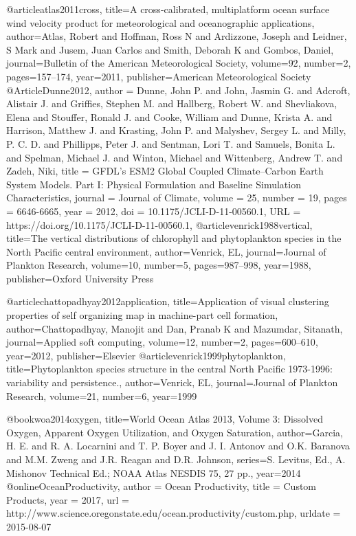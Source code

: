 {{{{{{{{{{{{@article{atlas2011cross,
  title={A cross-calibrated, multiplatform ocean surface wind velocity product for meteorological and oceanographic applications},
  author={Atlas, Robert and Hoffman, Ross N and Ardizzone, Joseph and Leidner, S Mark and Jusem, Juan Carlos and Smith, Deborah K and Gombos, Daniel},
  journal={Bulletin of the American Meteorological Society},
  volume={92},
  number={2},
  pages={157--174},
  year={2011},
  publisher={American Meteorological Society}
}
@Article{Dunne2012,
  author = {Dunne, John P. and John, Jasmin G. and Adcroft, Alistair J. and Griffies, Stephen M. and Hallberg, Robert W. and Shevliakova, Elena and Stouffer, Ronald J. and Cooke, William and Dunne, Krista A. and Harrison, Matthew J. and Krasting, John P. and Malyshev, Sergey L. and Milly, P. C. D. and Phillipps, Peter J. and Sentman, Lori T. and Samuels, Bonita L. and Spelman, Michael J. and Winton, Michael and Wittenberg, Andrew T. and Zadeh, Niki},
title = {GFDL’s ESM2 Global Coupled Climate–Carbon Earth System Models. Part I: Physical Formulation and Baseline Simulation Characteristics},
journal = {Journal of Climate},
volume = {25},
number = {19},
pages = {6646-6665},
year = {2012},
doi = {10.1175/JCLI-D-11-00560.1},
URL = {https://doi.org/10.1175/JCLI-D-11-00560.1},
}
@article{venrick1988vertical,
  title={The vertical distributions of chlorophyll and phytoplankton species in the North Pacific central environment},
  author={Venrick, EL},
  journal={Journal of Plankton Research},
  volume={10},
  number={5},
  pages={987--998},
  year={1988},
  publisher={Oxford University Press}
}

@article{chattopadhyay2012application,
  title={Application of visual clustering properties of self organizing map in machine-part cell formation},
  author={Chattopadhyay, Manojit and Dan, Pranab K and Mazumdar, Sitanath},
  journal={Applied soft computing},
  volume={12},
  number={2},
  pages={600--610},
  year={2012},
  publisher={Elsevier}
}
@article{venrick1999phytoplankton,
  title={Phytoplankton species structure in the central North Pacific 1973-1996: variability and persistence.},
  author={Venrick, EL},
  journal={Journal of Plankton Research},
  volume={21},
  number={6},
  year={1999}
}

@book{woa2014oxygen,
  title={World Ocean Atlas 2013, Volume 3: Dissolved Oxygen, Apparent Oxygen Utilization, and Oxygen Saturation},
  author={Garcia, H. E. and R. A. Locarnini and T. P. Boyer and J. I. Antonov and O.K. Baranova and M.M. Zweng and J.R. Reagan and D.R. Johnson},
  series={S. Levitus, Ed., A. Mishonov Technical Ed.; NOAA Atlas NESDIS 75, 27 pp.},
  year={2014}
}
@online{OceanProductivity,
  author = {{Ocean Productivity}},
  title = {Custom Products},
  year = {2017},
  url = {http://www.science.oregonstate.edu/ocean.productivity/custom.php},
  urldate = {2015-08-07}
}

}}}}}}}}}}}}
